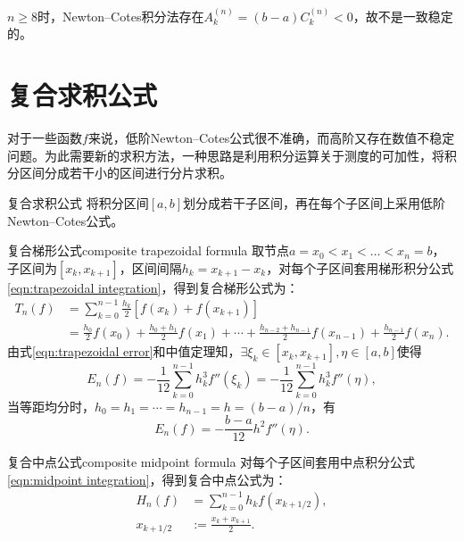 \begin{remark}
    $n \geq 8$时，Newton--Cotes积分法存在$A_k^{(n)} = (b - a)C_k^{(n)} < 0$，故不是一致稳定的。
\end{remark}

\section{复合求积公式}
\label{sec:composite quadrature rule}

对于一些函数$f$来说，低阶Newton--Cotes公式很不准确，而高阶又存在数值不稳定问题。为此需要新的求积方法，一种思路是利用积分运算关于测度的可加性，将积分区间分成若干小的区间进行分片求积。

\begin{definition}
    {复合求积公式}{}
    将积分区间$[a,b]$划分成若干子区间，再在每个子区间上采用低阶Newton--Cotes公式。
\end{definition}

\begin{example}
    {复合梯形公式}{composite trapezoidal formula}
    取节点$a = x_0 < x_1 < \ldots < x_n = b$，子区间为$[x_k,x_{k+1}]$，区间间隔$h_k = x_{k+1} - x_k$，对每个子区间套用梯形积分公式\eqref{eqn:trapezoidal integration}，得到复合梯形公式为：
    \begin{equation}
        \label{eqn:composite trapezoidal integration}
        \begin{aligned}
            T_n(f) &= \sum_{k=0}^{n-1}\frac{h_k}2[f(x_k) + f(x_{k+1})]\\
            &= \frac{h_0}2f(x_0) + \frac{h_0 + h_1}2f(x_1) + \cdots + \frac{h_{n-2} + h_{n-1}}2f(x_{n-1}) + \frac{h_{n-1}}2f(x_n).
        \end{aligned}
    \end{equation}
    由式\eqref{eqn:trapezoidal error}和中值定理知，$\exists\xi_k \in [x_k,x_{k+1}],\eta \in [a,b]$使得
    \begin{equation}
        E_n(f) = -\frac1{12}\sum_{k=0}^{n-1}h_k^3f''(\xi_k) = -\frac1{12}\sum_{k=0}^{n-1}h_k^3f''(\eta),
    \end{equation}
    当等距均分时，$h_0 = h_1 = \cdots = h_{n-1} = h = (b - a)/n$，有
    \begin{equation}
        E_n(f) = -\frac{b - a}{12}h^2f''(\eta).
    \end{equation}
\end{example}

\begin{example}
    {复合中点公式}{composite midpoint formula}
    对每个子区间套用中点积分公式\eqref{eqn:midpoint integration}，得到复合中点公式为：
    \begin{subequations}
        \begin{align}
            H_n(f) &= \sum_{k=0}^{n-1}h_kf(x_{k+1/2}),\\
            x_{k+1/2} &:= \frac{x_k + x_{k+1}}2.
        \end{align}
    \end{subequations}
\end{example}

